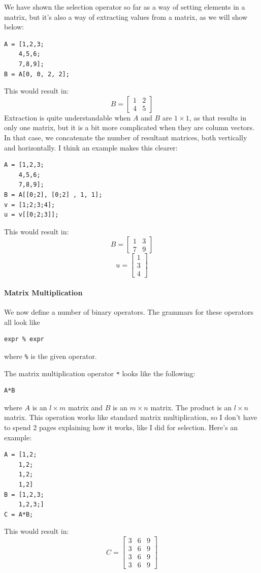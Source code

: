 We have shown the selection operator so far as a way of setting elements in a matrix, but it's also a way of extracting values from a matrix, as we will show below:
\begin{lstlisting}
A = [1,2,3;
    4,5,6;
    7,8,9];
B = A[0, 0, 2, 2];
\end{lstlisting}
This would result in:
$$B=\begin{bmatrix}1 & 2\\4 &5 \end{bmatrix}$$
Extraction is quite understandable when $A$ and $B$ are $1\times 1$, as that results in only one matrix, but it is a bit more complicated when they are column vectors.  In that case, we concatenate the number of resultant matrices, both vertically and horizontally.  I think an example makes this clearer:
\begin{lstlisting}
A = [1,2,3;
    4,5,6;
    7,8,9];
B = A[[0;2], [0;2] , 1, 1];
v = [1;2;3;4];
u = v[[0;2;3]];
\end{lstlisting}
This would result in:
$$B=\begin{bmatrix}1 & 3\\7 &9 \end{bmatrix}$$
$$u=\begin{bmatrix}1\\3\\4\end{bmatrix}$$

\paragraph{Matrix Multiplication}
We now define a number of binary operators.  The grammars for these operators all look like
\begin{lstlisting}
expr % expr
\end{lstlisting}
where \verb=%= is the given operator.

The matrix multiplication operator \verb=*= looks like the following:
\begin{lstlisting}
A*B
\end{lstlisting}
where $A$ is an $l\times m$ matrix and $B$ is an $m \times n$ matrix.  The product is an $l \times n$ matrix.  This operation works like standard matrix multiplication, so I don't have to spend 2 pages explaining how it works, like I did for selection.  Here's an example:
\begin{lstlisting}
A = [1,2;
    1,2;
    1,2;
    1,2]
B = [1,2,3;
    1,2,3;]
C = A*B;
\end{lstlisting}
This would result in:
$$C=\begin{bmatrix}3 & 6 & 9\\3 & 6 & 9\\3 & 6 & 9\\3 & 6 & 9\end{bmatrix}$$

